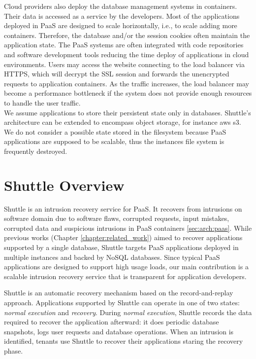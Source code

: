Cloud providers also deploy the database management systems in containers. Their data is accessed as a service by the developers. Most of the applications deployed in \ac{PaaS} are designed to scale horizontally, i.e., to scale adding more containers. Therefore, the database and/or the session cookies often maintain the application state. The \ac{PaaS} systems are often integrated with code repositories and software development tools reducing the time deploy of applications in cloud environments. Users may access the website connecting to the load balancer via \ac{HTTPS}, which will decrypt the \ac{SSL} session and forwards the unencrypted requests to application containers. As the traffic increases, the load balancer may become a performance bottleneck if the system does not provide enough resources to handle the user traffic.\\

We assume applications to store their persistent state only in databases. Shuttle's architecture can be extended to encompass object storage, for instance \acf{aws} \ac{s3}. We do not consider a possible state stored in the filesystem because \ac{PaaS} applications are supposed to be scalable, thus the instances file system is frequently destroyed.

\FloatBarrier
\section{Shuttle Overview}
\label{sec:arch:overview}
Shuttle is an intrusion recovery service for \ac{PaaS}. It recovers from intrusions on software domain due to software flaws, corrupted requests, input mistakes, corrupted data and suspicious intrusions in \ac{PaaS} containers \ref{sec:arch:paas}. While previous works (Chapter \ref{chapter:related_work}) aimed to recover applications supported by a single database, Shuttle targets \ac{PaaS} applications deployed in multiple instances and backed by \acs{NoSQL} databases. Since typical \ac{PaaS} applications are designed to support high usage loads, our main contribution is a scalable intrusion recovery service that is transparent for application developers. 

Shuttle is an automatic recovery mechanism based on the record-and-replay approach. Applications supported by Shuttle can operate in one of two states: \textit{normal execution} and \textit{recovery}. During \emph{normal execution}, Shuttle records the data required to recover the application afterward: it does periodic database snapshots, logs user requests and database operations. When an intrusion is identified, tenants use Shuttle to recover their applications staring the recovery phase.

